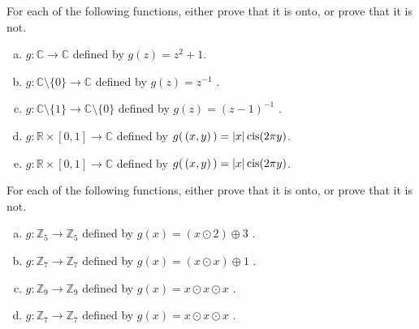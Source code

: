 \begin{exercise}{}
For each of the following  functions, either prove that it is onto, or prove that it is not.
\begin{enumerate}[(a)]
\item
 $g \colon {\mathbb C}  \to {\mathbb C} $ defined by $g(z) =  z^2+1$.
\item
 $g \colon {\mathbb C}\setminus \{0\}  \to {\mathbb C} $ defined by $g(z) =  z^{-1}$ .
\item
 $g \colon {\mathbb C}\setminus \{1\}  \to {\mathbb C}\setminus \{0\} $ defined by $g(z) =  (z-1)^{-1}$ .
\item
 $g \colon {\mathbb R} \times [0,1]  \to {\mathbb C} $ defined by $g(\,(x,y)\,) =  |x| \operatorname{cis} ( 2\pi y)$.
\item
 $g \colon {\mathbb R} \times [0,1]  \to {\mathbb C} $ defined by $g(\,(x,y)\,) =  |x| \operatorname{cis} ( 2\pi y)$.
\end{enumerate}
\end{exercise}


\begin{exercise}{}
For each of the following  functions, either prove that it is onto, or prove that it is not.
\begin{enumerate}[(a)]
\item \label{modular_m3}
 $g \colon {\mathbb Z}_5 \to {\mathbb Z}_{5}$ defined by $g(x) =  (x \odot 2) \oplus 3$ .
\item 
 $g \colon {\mathbb Z}_7 \to {\mathbb Z}_7$ defined by $g(x)= (x \odot x) \oplus 1 $ .
\item 
 $g \colon {\mathbb Z}_9 \to {\mathbb Z}_9$ defined by $g(x)= x \odot x \odot x$ .
\item 
 $g \colon {\mathbb Z}_7 \to {\mathbb Z}_7$ defined by $g(x)= x \odot x \odot x$ .
\end{enumerate}
\end{exercise}




